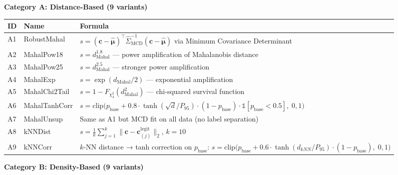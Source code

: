 \documentclass[
  11pt,
]{article}
\newcounter{none} %
\begin{document}
\textbf{Category A: Distance-Based (9 variants)}

{\def\LTcaptype{none} %
\begin{longtable}[]{@{}
  >{\raggedright\arraybackslash}p{}
  >{\raggedright\arraybackslash}p{}
  >{\raggedright\arraybackslash}p{}@{}}
\toprule\noalign{}
\begin{minipage}[b]{\linewidth}\raggedright
ID
\end{minipage} & \begin{minipage}[b]{\linewidth}\raggedright
Name
\end{minipage} & \begin{minipage}[b]{\linewidth}\raggedright
Formula
\end{minipage} \\
\midrule\noalign{}
\endhead
\bottomrule\noalign{}
\endlastfoot
A1 & RobustMahal &
\(s = (\mathbf{c} - \hat{\boldsymbol{\mu}})^\top \hat{\Sigma}_{\text{MCD}}^{-1} (\mathbf{c} - \hat{\boldsymbol{\mu}})\)
via Minimum Covariance Determinant \\
A2 & MahalPow18 & \(s = d_{\text{Mahal}}^{1.8}\) — power amplification
of Mahalanobis distance \\
A3 & MahalPow25 & \(s = d_{\text{Mahal}}^{2.5}\) — stronger power
amplification \\
A4 & MahalExp & \(s = \exp(d_{\text{Mahal}} / 2)\) — exponential
amplification \\
A5 & MahalChi2Tail & \(s = 1 - F_{\chi^2_4}(d_{\text{Mahal}}^2)\) —
chi-squared survival function \\
A6 & MahalTanhCorr &
\(s = \text{clip}\big(p_{\text{base}} + 0.8 \cdot \tanh(\sqrt{d}/P_{95}) \cdot (1-p_{\text{base}}) \cdot \mathbb{1}[p_{\text{base}}<0.5],\; 0, 1\big)\) \\
A7 & MahalUnsup & Same as A1 but MCD fit on all data (no label
separation) \\
A8 & kNNDist &
\(s = \frac{1}{k}\sum_{j=1}^{k}\|\mathbf{c} - \mathbf{c}_{(j)}^{\text{legit}}\|_2\),
\(k=10\) \\
A9 & kNNCorr & \(k\)-NN distance → tanh correction on
\(p_{\text{base}}\):
\(s = \text{clip}\big(p_{\text{base}} + 0.6 \cdot \tanh(d_{kNN}/P_{95}) \cdot (1-p_{\text{base}}),\; 0, 1\big)\) \\
\end{longtable}
}

\textbf{Category B: Density-Based (9 variants)}
\end{document}
